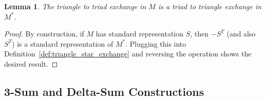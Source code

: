 \documentclass{article}
\newtheorem{lemma}{Lemma}
\theoremstyle{definition}
\begin{document}
\begin{lemma}
    The triangle to triad exchange in $M$ is a triad to triangle exchange in $M^{*}$.
\end{lemma}

\begin{proof}
    By construction, if $M$ has standard representation $S$, then $-S^{T}$ (and also $S^{T}$) is a standard representation of $M^{*}$. Plugging this into Definition~\ref{def:triangle_star_exchange} and reversing the operation shows the desired result.
\end{proof}


\subsection{3-Sum and Delta-Sum Constructions}
\end{document}
